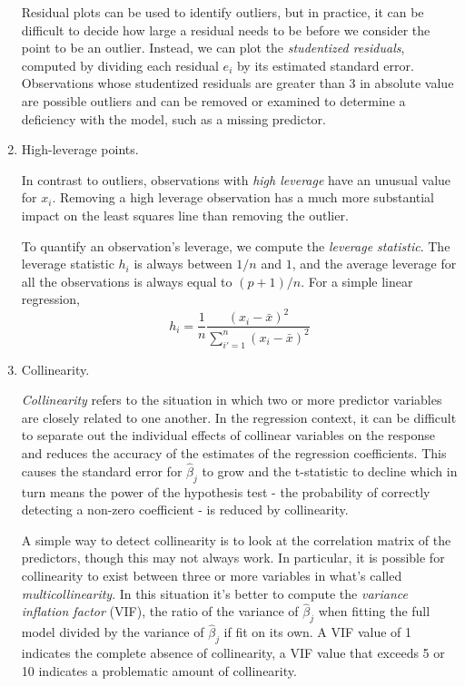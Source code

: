 \documentclass{article}
\numberwithin{equation}{section}
\begin{document}
\begin{enumerate}
    Residual plots can be used to identify outliers, but in practice, it can be difficult to decide how large a residual needs to be before we consider the point to be an outlier. Instead, we can plot the \textit{studentized residuals}, computed by dividing each residual $e_i$ by its estimated standard error. Observations whose studentized residuals are greater than 3 in absolute value are possible outliers and can be removed or examined to determine a deficiency with the model, such as a missing predictor.
    
    \item High-leverage points.
    
    In contrast to outliers, observations with \textit{high leverage} have an unusual value for $x_i$. Removing a high leverage observation has a much more substantial impact on the least squares line than removing the outlier.
    
    To quantify an observation’s leverage, we compute the \textit{leverage statistic}. The leverage statistic $h_i$ is always between $1/n$ and $1$, and the average leverage for all the observations is always equal to $(p + 1)/n$. For a simple linear regression,
    \begin{equation}
        h_i =  \frac{1}{n} \frac{(x_i - \bar x)^2}{\sum_{i' = 1}^n (x_i - \bar x)^2}
    \end{equation}
    
    \item Collinearity.
    
    \textit{Collinearity} refers to the situation in which two or more predictor variables are closely related to one another. In the regression context, it can be difficult to separate out the individual effects of collinear variables on the response and reduces the accuracy of the estimates of the regression coefficients. This causes the standard error for $\hat \beta_j$ to grow and the t-statistic to decline which in turn means the power of the hypothesis test - the probability of correctly detecting a non-zero coefficient - is reduced by collinearity.
    
    A simple way to detect collinearity is to look at the correlation matrix of the predictors, though this may not always work. In particular, it is possible for collinearity to exist between three or more variables in what's called \textit{multicollinearity}. In this situation it's better to compute the \textit{variance inflation factor} (VIF), the ratio of the variance of $\hat \beta_j$ when fitting the full model divided by the variance of $\hat \beta_j$ if fit on its own. A VIF value of 1 indicates the complete absence of collinearity, a VIF value that exceeds 5 or 10 indicates a problematic amount of collinearity.
    

\end{enumerate}
\end{document}
